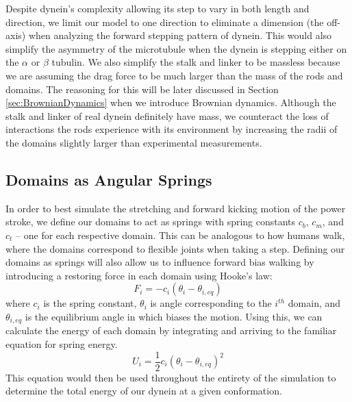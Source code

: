 Despite dynein's complexity allowing its step to vary in both length and direction, we limit our model to one direction to eliminate a dimension (the off-axis) when analyzing the forward stepping pattern of dynein. This would also simplify the asymmetry of the microtubule when the dynein is stepping either on the $\alpha$ or $\beta$ tubulin. We also simplify the stalk and linker to be massless because we are assuming the drag force to be much larger than the mass of the rods and domains. The reasoning for this will be later discussed in Section \ref{sec:BrownianDynamics} when we introduce Brownian dynamics. Although the stalk and linker of real dynein definitely have mass, we counteract the loss of interactions the rods experience with its environment by increasing the radii of the domains slightly larger than experimental measurements.

\subsection{Domains as Angular Springs}
In order to best simulate the stretching and forward kicking motion of the power stroke, we define our domains to act as springs with spring constants $c_b$, $c_m$, and $c_t$ -- one for each respective domain. This can be analogous to how humans walk, where the domains correspond to flexible joints when taking a step. Defining our domains as springs will also allow us to influence forward bias walking by introducing a restoring force in each domain using Hooke's law: 
\begin{equation}
    F_i=-c_i(\theta_i-\theta_{i,eq})
\end{equation}
where $c_i$ is the spring constant, $\theta_i$ is angle corresponding to the $i^{th}$ domain, and $\theta_{i,eq}$ is the equilibrium angle in which biases the motion. Using this, we can calculate the energy of each domain by integrating and arriving to the familiar equation for spring energy.
\begin{equation} \label{eqn:energy}
    U_i=\frac{1}{2}c_i(\theta_i-\theta_{i,eq})^2
\end{equation}
This equation would then be used throughout the entirety of the simulation to determine the total energy of our dynein at a given conformation. 


